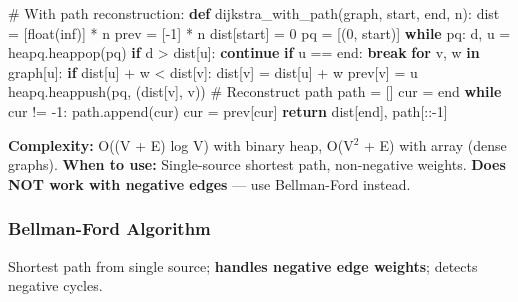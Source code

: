 \documentclass[11pt]{article}
\newenvironment{Shaded}{\begin{snugshade}}{\end{snugshade}}
\newcommand{\BuiltInTok}[1]{\textcolor[rgb]{0.50,0.55,0.55}{#1}}
\newcommand{\CommentTok}[1]{\textcolor[rgb]{0.48,0.49,0.49}{#1}}
\newcommand{\ControlFlowTok}[1]{\textcolor[rgb]{0.99,0.74,0.29}{\textbf{#1}}}
\newcommand{\DecValTok}[1]{\textcolor[rgb]{0.96,0.45,0.00}{#1}}
\newcommand{\KeywordTok}[1]{\textcolor[rgb]{0.81,0.81,0.76}{\textbf{#1}}}
\newcommand{\NormalTok}[1]{\textcolor[rgb]{0.81,0.81,0.76}{#1}}
\newcommand{\OperatorTok}[1]{\textcolor[rgb]{0.81,0.81,0.76}{#1}}
\newcommand{\StringTok}[1]{\textcolor[rgb]{0.96,0.31,0.31}{#1}}
\begin{document}
\begin{Shaded}
\begin{Highlighting}[]
\CommentTok{\# With path reconstruction:}
\KeywordTok{def}\NormalTok{ dijkstra\_with\_path(graph, start, end, n):}
\NormalTok{    dist }\OperatorTok{=}\NormalTok{ [}\BuiltInTok{float}\NormalTok{(}\StringTok{\textquotesingle{}inf\textquotesingle{}}\NormalTok{)] }\OperatorTok{*}\NormalTok{ n}
\NormalTok{    prev }\OperatorTok{=}\NormalTok{ [}\OperatorTok{{-}}\DecValTok{1}\NormalTok{] }\OperatorTok{*}\NormalTok{ n}
\NormalTok{    dist[start] }\OperatorTok{=} \DecValTok{0}
\NormalTok{    pq }\OperatorTok{=}\NormalTok{ [(}\DecValTok{0}\NormalTok{, start)]}
    \ControlFlowTok{while}\NormalTok{ pq:}
\NormalTok{        d, u }\OperatorTok{=}\NormalTok{ heapq.heappop(pq)}
        \ControlFlowTok{if}\NormalTok{ d }\OperatorTok{\textgreater{}}\NormalTok{ dist[u]: }\ControlFlowTok{continue}
        \ControlFlowTok{if}\NormalTok{ u }\OperatorTok{==}\NormalTok{ end: }\ControlFlowTok{break}
        \ControlFlowTok{for}\NormalTok{ v, w }\KeywordTok{in}\NormalTok{ graph[u]:}
            \ControlFlowTok{if}\NormalTok{ dist[u] }\OperatorTok{+}\NormalTok{ w }\OperatorTok{\textless{}}\NormalTok{ dist[v]:}
\NormalTok{                dist[v] }\OperatorTok{=}\NormalTok{ dist[u] }\OperatorTok{+}\NormalTok{ w}
\NormalTok{                prev[v] }\OperatorTok{=}\NormalTok{ u}
\NormalTok{                heapq.heappush(pq, (dist[v], v))}
    \CommentTok{\# Reconstruct path}
\NormalTok{    path }\OperatorTok{=}\NormalTok{ []}
\NormalTok{    cur }\OperatorTok{=}\NormalTok{ end}
    \ControlFlowTok{while}\NormalTok{ cur }\OperatorTok{!=} \OperatorTok{{-}}\DecValTok{1}\NormalTok{:}
\NormalTok{        path.append(cur)}
\NormalTok{        cur }\OperatorTok{=}\NormalTok{ prev[cur]}
    \ControlFlowTok{return}\NormalTok{ dist[end], path[::}\OperatorTok{{-}}\DecValTok{1}\NormalTok{]}
\end{Highlighting}
\end{Shaded}

\textbf{Complexity:} O((V + E) log V) with binary heap, O(V\(^2\) + E) with array (dense graphs).
\textbf{When to use:} Single-source shortest path, non-negative weights.
\textbf{Does NOT work with negative edges} --- use Bellman-Ford instead.

\subsubsection{Bellman-Ford Algorithm}\label{bellman-ford-algorithm}

Shortest path from single source; \textbf{handles negative edge weights}; detects negative cycles.
\end{document}
